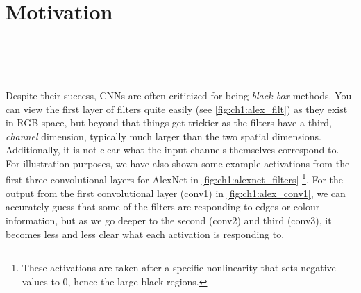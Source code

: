 \section{Motivation}\label{sec:ch1:motivation}
\begin{figure}
  \centering
  \\
  \\
  \\
  \label{fig:ch1:alexnet_filters}
\end{figure}

Despite their success, CNNs are often criticized for being \emph{black-box}
methods. You can view the first layer of filters
quite easily (see \autoref{fig:ch1:alex_filt}) as they exist in RGB
space, but beyond that things get trickier as the filters have a third, \emph{channel}
dimension, typically much larger than the two spatial dimensions. Additionally,
it is not clear what the input channels themselves correspond to. For illustration
purposes, we have also shown some example activations from the first three
convolutional layers for AlexNet in
\autoref{fig:ch1:alexnet_filters}-\footnote{These activations are
taken after a specific nonlinearity that sets negative values to 0, hence the
large black regions.}. For the output from the first convolutional layer (conv1) in
\autoref{fig:ch1:alex_conv1}, we can accurately guess that some of the filters are responding to
edges or colour information, but as we go deeper to
the second (conv2) and third (conv3), it becomes less and less clear what each activation is
responding to.


